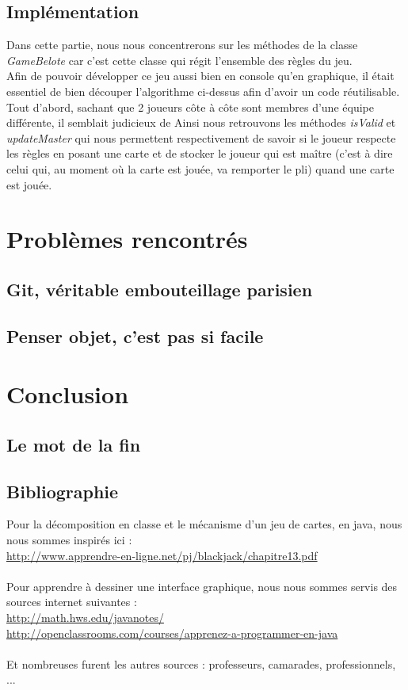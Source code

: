 \documentclass[a4paper]{report}
\begin{document}
\subsection{Implémentation}
Dans cette partie, nous nous concentrerons sur les méthodes de la classe \textit{GameBelote} car c'est cette classe qui régit l'ensemble des règles du jeu.\\
Afin de pouvoir développer ce jeu aussi bien en console qu'en graphique, il était essentiel de bien découper l'algorithme ci-dessus afin d'avoir un code réutilisable.\\
Tout d'abord, sachant que 2 joueurs côte à côte sont membres d'une équipe différente, il semblait judicieux de 
Ainsi nous retrouvons les méthodes \textit{isValid} et \textit{updateMaster} qui nous permettent respectivement de savoir si le joueur respecte les règles en posant une carte et de stocker le joueur qui est maître (c'est à dire celui qui, au moment où la carte est jouée, va remporter le pli) quand une carte est jouée.


\newpage
\section{Problèmes rencontrés}
\subsection{Git, véritable embouteillage parisien}
\subsection{Penser objet, c'est pas si facile}

\newpage
\section{Conclusion}
\subsection{Le mot de la fin}
\subsection{Bibliographie}
Pour la décomposition en classe et le mécanisme d'un jeu de cartes, en java, nous nous sommes inspirés ici : \\
\url{http://www.apprendre-en-ligne.net/pj/blackjack/chapitre13.pdf}\\\\
Pour apprendre à dessiner une interface graphique, nous nous sommes servis des sources internet suivantes : \\
\url{http://math.hws.edu/javanotes/}\\
\url{http://openclassrooms.com/courses/apprenez-a-programmer-en-java}\\\\
Et nombreuses furent les autres sources : professeurs, camarades, professionnels, ...
\end{document}
